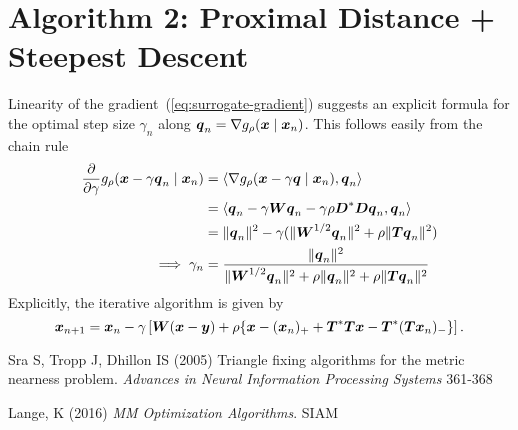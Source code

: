 \documentclass{article}
\begin{document}
\section*{\center Algorithm 2: Proximal Distance + Steepest Descent}

Linearity of the gradient~(\ref{eq:surrogate-gradient}) suggests an explicit formula for the optimal step size \(\gamma_{n}\) along \(\boldsymbol{q}_{n} = \nabla g_{\rho}(\boldsymbol{x} \mid \boldsymbol{x}_{n})\).
This follows easily from the chain rule
\begin{equation*}
  \begin{split}
    \frac{\partial}{\partial \gamma} g_{\rho}(\boldsymbol{x} - \gamma \boldsymbol{q}_{n} \mid \boldsymbol{x}_{n})
    &=
    \langle{\nabla g_{\rho}(\boldsymbol{x}- \gamma \boldsymbol{q}\mid \boldsymbol{x}_{n}), \boldsymbol{q}_{n}}\rangle \\
    &=
    \langle{
      \boldsymbol{q}_{n}
        - \gamma \boldsymbol{W}\boldsymbol{q}_{n}
        - \gamma \rho \boldsymbol{D}^{\ast} \boldsymbol{D}\boldsymbol{q}_{n},
     \boldsymbol{q}_{n}}\rangle \\
    &=
    \lVert{\boldsymbol{q}_{n}}\rVert^{2}
    - \gamma (\lVert{\boldsymbol{W}^{1/2} \boldsymbol{q}_{n}}\rVert^{2} + \rho \lVert{\boldsymbol{T}\boldsymbol{q}_{n}}\rVert^{2}) \\
    \implies \gamma_{n}
    &=
    \frac{\lVert{\boldsymbol{q}_{n}}\rVert^{2}}{
        \lVert{\boldsymbol{W}^{1/2} \boldsymbol{q}_{n}}\rVert^{2}
        + \rho \lVert{\boldsymbol{q}_{n}}\rVert^{2}
        + \rho \lVert{\boldsymbol{T}\boldsymbol{q}_{n}}\rVert^{2}
    }
  \end{split}
\end{equation*}
Explicitly, the iterative algorithm is given by
\begin{equation*}
    \boldsymbol{x}_{n+1}
    =
    \boldsymbol{x}_{n}
    - \gamma \left[
    \boldsymbol{W} (\boldsymbol{x} - \boldsymbol{y}) + \rho \{
        \boldsymbol{x} - (\boldsymbol{x}_{n})_{+}
        + \boldsymbol{T}^{\ast} \boldsymbol{T} \boldsymbol{x} - \boldsymbol{T}^{\ast} (\boldsymbol{T} \boldsymbol{x}_{n})_{-}
        \}
    \right].
\end{equation*}
\begin{thebibliography}{99}
    Sra S, Tropp J, Dhillon IS (2005) {Triangle fixing algorithms for the metric nearness problem}. {\it Advances in Neural Information Processing Systems} 361-368
    
    Lange, K (2016) {\it MM Optimization Algorithms}. SIAM
\end{thebibliography}
\end{document}
